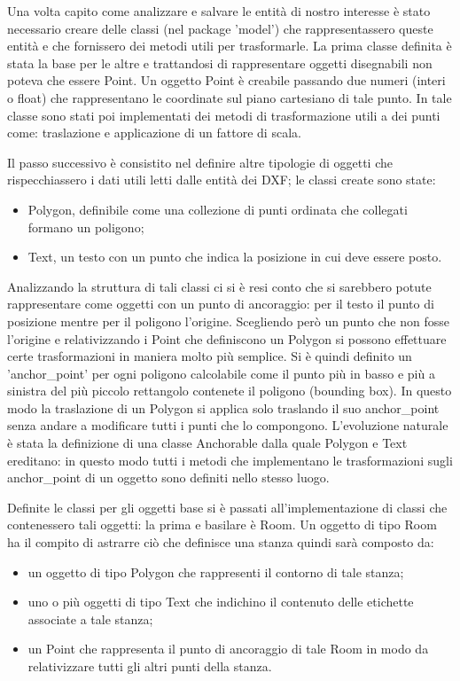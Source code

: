 \documentclass[12pt]{report}
\begin{document}
Una volta capito come analizzare e salvare le entità di nostro interesse è stato necessario creare delle classi (nel package 'model') che rappresentassero queste entità e che fornissero dei metodi utili per trasformarle. 
La prima classe definita è stata la base per le altre e trattandosi di rappresentare oggetti disegnabili non poteva che essere Point. 
Un oggetto Point è creabile passando due numeri (interi o float) che rappresentano le coordinate sul piano cartesiano di tale punto. 
In tale classe sono stati poi implementati dei metodi di trasformazione utili a dei punti come: traslazione e applicazione di un fattore di scala.

Il passo successivo è consistito nel definire altre tipologie di oggetti che rispecchiassero i dati utili letti dalle entità dei DXF; le classi create sono state:
\begin{itemize}
\item Polygon, definibile come una collezione di punti ordinata che collegati formano un poligono;
\item Text, un testo con un punto che indica la posizione in cui deve essere posto.
\end{itemize}

Analizzando la struttura di tali classi ci si è resi conto che si sarebbero potute rappresentare come oggetti con un punto di ancoraggio: per il testo il punto di posizione mentre per il poligono l'origine. 
Scegliendo però un punto che non fosse l'origine e relativizzando i Point che definiscono un Polygon si possono effettuare certe trasformazioni in maniera molto più semplice. Si è quindi definito un 'anchor\_point' per ogni poligono calcolabile come il punto più in basso e più a sinistra del più piccolo rettangolo contenete il poligono (bounding box). 
In questo modo la traslazione di un Polygon si applica solo traslando il suo anchor\_point senza andare a modificare tutti i punti che lo compongono. 
L'evoluzione naturale è stata la definizione di una classe Anchorable dalla quale Polygon e Text ereditano: in questo modo tutti i metodi che implementano le trasformazioni sugli anchor\_point di un oggetto sono definiti nello stesso luogo.

Definite le classi per gli oggetti base si è passati all'implementazione di classi che contenessero tali oggetti: la prima e basilare è Room.
Un oggetto di tipo Room ha il compito di astrarre ciò che definisce una stanza quindi sarà composto da:
\begin{itemize}
\item un oggetto di tipo Polygon che rappresenti il contorno di tale stanza;
\item uno o più oggetti di tipo Text che indichino il contenuto delle etichette associate a tale stanza;
\item un Point che rappresenta il punto di ancoraggio di tale Room in modo da relativizzare tutti gli altri punti della stanza.
\end{itemize}
\end{document}
